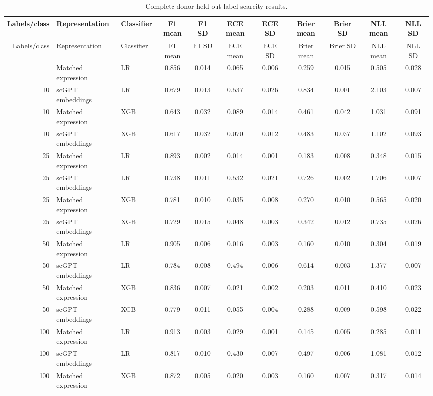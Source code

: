 \begin{landscape}\scriptsize\setlength{\tabcolsep}{4pt}
\begin{longtable}{rllcccccccc}
\caption{Complete donor-held-out label-scarcity results.}\label{tab:s5}\\
\toprule Labels/class & Representation & Classifier & F1 mean & F1 SD & ECE mean & ECE SD & Brier mean & Brier SD & NLL mean & NLL SD \\
\midrule\endfirsthead\toprule Labels/class & Representation & Classifier & F1 mean & F1 SD & ECE mean & ECE SD & Brier mean & Brier SD & NLL mean & NLL SD \\
\midrule\endhead\bottomrule\endlastfoot
10 & Matched expression & LR & 0.856 & 0.014 & 0.065 & 0.006 & 0.259 & 0.015 & 0.505 & 0.028 \\
10 & scGPT embeddings & LR & 0.679 & 0.013 & 0.537 & 0.026 & 0.834 & 0.001 & 2.103 & 0.007 \\
10 & Matched expression & XGB & 0.643 & 0.032 & 0.089 & 0.014 & 0.461 & 0.042 & 1.031 & 0.091 \\
10 & scGPT embeddings & XGB & 0.617 & 0.032 & 0.070 & 0.012 & 0.483 & 0.037 & 1.102 & 0.093 \\
25 & Matched expression & LR & 0.893 & 0.002 & 0.014 & 0.001 & 0.183 & 0.008 & 0.348 & 0.015 \\
25 & scGPT embeddings & LR & 0.738 & 0.011 & 0.532 & 0.021 & 0.726 & 0.002 & 1.706 & 0.007 \\
25 & Matched expression & XGB & 0.781 & 0.010 & 0.035 & 0.008 & 0.270 & 0.010 & 0.565 & 0.020 \\
25 & scGPT embeddings & XGB & 0.729 & 0.015 & 0.048 & 0.003 & 0.342 & 0.012 & 0.735 & 0.026 \\
50 & Matched expression & LR & 0.905 & 0.006 & 0.016 & 0.003 & 0.160 & 0.010 & 0.304 & 0.019 \\
50 & scGPT embeddings & LR & 0.784 & 0.008 & 0.494 & 0.006 & 0.614 & 0.003 & 1.377 & 0.007 \\
50 & Matched expression & XGB & 0.836 & 0.007 & 0.021 & 0.002 & 0.203 & 0.011 & 0.410 & 0.023 \\
50 & scGPT embeddings & XGB & 0.779 & 0.011 & 0.055 & 0.004 & 0.288 & 0.009 & 0.598 & 0.022 \\
100 & Matched expression & LR & 0.913 & 0.003 & 0.029 & 0.001 & 0.145 & 0.005 & 0.285 & 0.011 \\
100 & scGPT embeddings & LR & 0.817 & 0.010 & 0.430 & 0.007 & 0.497 & 0.006 & 1.081 & 0.012 \\
100 & Matched expression & XGB & 0.872 & 0.005 & 0.020 & 0.003 & 0.160 & 0.007 & 0.317 & 0.014 \\

\end{longtable}
\end{landscape}

